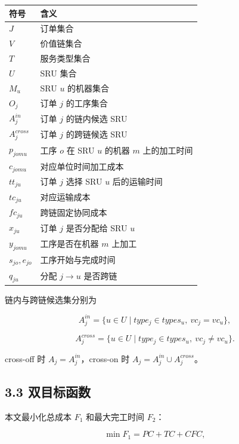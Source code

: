 \documentclass[UTF8,11pt]{ctexart}
\begin{document}
\begin{table}[H]
\centering
\small
\begin{tabularx}{\textwidth}{>{\raggedright\arraybackslash}p{} >{\raggedright\arraybackslash}X}
\toprule
符号 & 含义 \\
\midrule
\(J\) & 订单集合 \\
\(V\) & 价值链集合 \\
\(T\) & 服务类型集合 \\
\(U\) & SRU 集合 \\
\(M_u\) & SRU \(u\) 的机器集合 \\
\(O_j\) & 订单 \(j\) 的工序集合 \\
\(A_j^{in}\) & 订单 \(j\) 的链内候选 SRU \\
\(A_j^{cross}\) & 订单 \(j\) 的跨链候选 SRU \\
\(p_{jomu}\) & 工序 \(o\) 在 SRU \(u\) 的机器 \(m\) 上的加工时间 \\
\(c_{jomu}\) & 对应单位时间加工成本 \\
\(tt_{ju}\) & 订单 \(j\) 选择 SRU \(u\) 后的运输时间 \\
\(tc_{ju}\) & 对应运输成本 \\
\(fc_{ju}\) & 跨链固定协同成本 \\
\(x_{ju}\) & 订单 \(j\) 是否分配给 SRU \(u\) \\
\(y_{jomu}\) & 工序是否在机器 \(m\) 上加工 \\
\(s_{jo},e_{jo}\) & 工序开始与完成时间 \\
\(q_{ju}\) & 分配 \(j\rightarrow u\) 是否跨链 \\
\bottomrule
\end{tabularx}
\end{table}

链内与跨链候选集分别为

\[
A_j^{in}=\{u\in U\mid type_j\in types_u,\ vc_j=vc_u\},
\]

\[
A_j^{cross}=\{u\in U\mid type_j\in types_u,\ vc_j\ne vc_u\}.
\]

cross-off 时 \(A_j=A_j^{in}\)，cross-on 时 \(A_j=A_j^{in}\cup A_j^{cross}\)。

\subsection*{3.3 双目标函数}

本文最小化总成本 \(F_1\) 和最大完工时间 \(F_2\)：

\[
\min F_1=PC+TC+CFC,
\]
\end{document}
